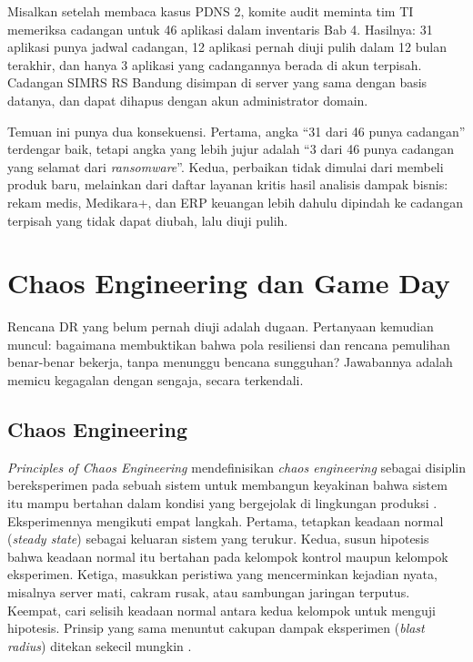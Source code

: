 \begin{kasus}[title={Kasus Medikara Health: Audit Cadangan Setelah Membaca Kasus PDNS 2}]
  Misalkan setelah membaca kasus PDNS 2, komite audit meminta tim TI memeriksa cadangan untuk 46
  aplikasi dalam inventaris Bab 4. Hasilnya: 31 aplikasi punya jadwal cadangan, 12 aplikasi pernah
  diuji pulih dalam 12 bulan terakhir, dan hanya 3 aplikasi yang cadangannya berada di akun
  terpisah. Cadangan SIMRS RS Bandung disimpan di server yang sama dengan basis datanya, dan dapat
  dihapus dengan akun administrator domain.

  Temuan ini punya dua konsekuensi. Pertama, angka ``31 dari 46 punya cadangan'' terdengar baik,
  tetapi angka yang lebih jujur adalah ``3 dari 46 punya cadangan yang selamat dari
  \textit{ransomware}''. Kedua, perbaikan tidak dimulai dari membeli produk baru, melainkan dari
  daftar layanan kritis hasil analisis dampak bisnis: rekam medis, Medikara+, dan ERP keuangan
  lebih dahulu dipindah ke cadangan terpisah yang tidak dapat diubah, lalu diuji pulih.
\end{kasus}

\section{Chaos Engineering dan Game Day}
\label{sec:ch12-chaos}

Rencana DR yang belum pernah diuji adalah dugaan. Pertanyaan kemudian muncul: bagaimana membuktikan
bahwa pola resiliensi dan rencana pemulihan benar-benar bekerja, tanpa menunggu bencana sungguhan?
Jawabannya adalah memicu kegagalan dengan sengaja, secara terkendali.

\subsection{Chaos Engineering}

\textit{Principles of Chaos Engineering} mendefinisikan \textit{chaos engineering} sebagai disiplin
bereksperimen pada sebuah sistem untuk membangun keyakinan bahwa sistem itu mampu bertahan dalam
kondisi yang bergejolak di lingkungan produksi \cite{c12-principles-chaos}. Eksperimennya mengikuti
empat langkah. Pertama, tetapkan keadaan normal (\textit{steady state}) sebagai keluaran sistem yang
terukur. Kedua, susun hipotesis bahwa keadaan normal itu bertahan pada kelompok kontrol maupun
kelompok eksperimen. Ketiga, masukkan peristiwa yang mencerminkan kejadian nyata, misalnya server
mati, cakram rusak, atau sambungan jaringan terputus. Keempat, cari selisih keadaan normal antara
kedua kelompok untuk menguji hipotesis. Prinsip yang sama menuntut cakupan dampak eksperimen
(\textit{blast radius}) ditekan sekecil mungkin \cite{c12-principles-chaos}.

